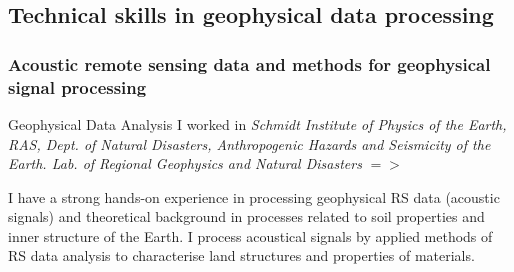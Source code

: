 \documentclass[pdflatex,compress,8pt,
	xcolor={dvipsnames,dvipsnames,svgnames,x11names,table},
	hyperref={colorlinks = true,breaklinks = true, urlcolor = NavyBlue, breaklinks = true}]{beamer}
\begin{document}
\subsection{Technical skills in geophysical data processing}
\begin{frame}\frametitle{Acoustic remote sensing data and methods for geophysical signal processing}

\begin{alertblock}{Geophysical Data Analysis}
I worked in \emph{Schmidt Institute of Physics of the Earth, RAS, Dept. of Natural Disasters, Anthropogenic Hazards and Seismicity of the Earth. Lab. of Regional Geophysics and Natural Disasters} $=>$ 

I have a strong hands-on experience in processing geophysical RS data (acoustic signals) and theoretical background in processes related to soil properties and inner structure of the Earth. I process acoustical signals by applied methods of RS data analysis to characterise land structures and properties of materials. 
\end{alertblock}


\end{frame}
\end{document}
